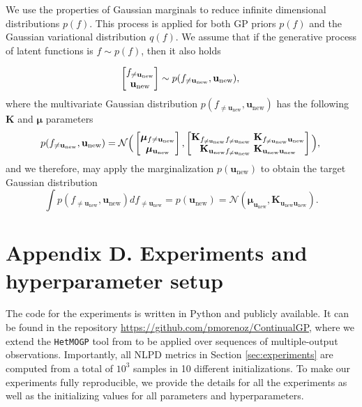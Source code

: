 \documentclass[]{article}
\def\K{{\mathbf K}}
\def\u{{\mathbf u}}
\newcommand{\unew}{{\u_{\text{new}}}}
\begin{document}
We use the properties of Gaussian marginals to reduce infinite dimensional distributions $p(f)$. This process is applied for both GP priors $p(f)$ and the Gaussian variational distribution $q(f)$. We assume that if the generative process of latent functions is $f\sim p(f)$, then it also holds

\begin{equation*}
\begin{bmatrix}
f_{\neq\unew}\\\unew
\end{bmatrix} \sim p(f_{\neq\unew}, \unew),\\
\end{equation*}
where the multivariate Gaussian distribution $p(f_{\neq\unew}, \unew)$ has the following $\K$ and $\bm{\mu}$ parameters
\begin{equation*}
p(f_{\neq\unew}, \unew) = \mathcal{N}\Big(\begin{bmatrix}
\bm{\mu}_{f\neq\unew}\\\bm{\mu}_\unew
\end{bmatrix}, \begin{bmatrix}
\K_{f_{\neq\unew}f_{\neq\unew}} \; \K_{f_{\neq\unew}\unew}\\\K_{\unew f_{\neq\unew}} \; \K_{\unew \unew}
\end{bmatrix}\Big),\\
\end{equation*}
and we therefore, may apply the marginalization $p(\unew)$ to obtain the target Gaussian distribution
\begin{equation*}
\int p(f_{\neq\unew}, \unew) df_{\neq\unew} = p(\unew) = \mathcal{N}(\bm{\mu}_\unew, \K_{\unew \unew}).
\end{equation*}



\section*{Appendix D. Experiments and hyperparameter setup}
\label{app:gradients}

The code for the experiments is written in Python and publicly available. It can be found in the repository \url{https://github.com/pmorenoz/ContinualGP}, where we extend the \texttt{HetMOGP} tool from \citet{morenomunoz2018} to be applied over sequences of multiple-output observations. Importantly, all NLPD metrics in Section \ref{sec:experiments} are computed from a total of $10^3$ samples in 10 different initializations. To make our experiments fully reproducible, we provide the details for all the experiments as well as the initializing values for all parameters and hyperparameters.
\end{document}
